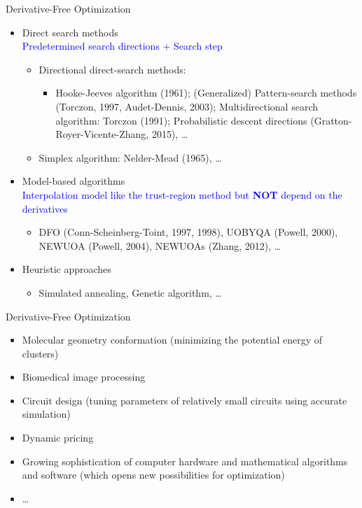 \documentclass{beamer}
\begin{document}
\begin{frame}{Derivative-Free Optimization}
	\begin{itemize}
		\item Direct search methods
			\\
			{\large
			\textcolor{blue}{Predetermined search
			directions + Search step} }
			\begin{itemize}
				\item Directional direct-search methods:
					\begin{itemize}
						\item Hooke-Jeeves algorithm (1961);
						 (Generalized) Pattern-search methods
							(Torczon, 1997, Audet-Dennis, 2003);
						Multidirectional search algorithm: Torczon (1991);
						Probabilistic descent directions
							(Gratton-Royer-Vicente-Zhang, 2015),
						\dots
					\end{itemize}
				\item Simplex algorithm: Nelder-Mead (1965),
					\dots
			\end{itemize}
		\item Model-based algorithms
			\\
			{\large \textcolor{blue}{
				Interpolation model like the trust-region method
				but \textbf{NOT} depend on the derivatives
				}}
			\begin{itemize}
				\item
					{\footnotesize
					DFO (Conn-Scheinberg-Toint,
					1997, 1998), UOBYQA (Powell, 2000), NEWUOA
					(Powell, 2004), NEWUOAs (Zhang, 2012), \dots
					}
			\end{itemize}
		\item Heuristic approaches
			\begin{itemize}
				\item Simulated annealing, Genetic algorithm, \ldots
			\end{itemize}
	\end{itemize}
\end{frame}

\begin{frame}{Derivative-Free Optimization}
\begin{itemize}
	\item Molecular geometry conformation
		(minimizing the potential energy of clusters)
	\item Biomedical image processing
	\item Circuit design (tuning parameters of relatively small
		circuits using accurate simulation)
	\item Dynamic pricing
	\item Growing sophistication of computer hardware and
		mathematical algorithms and software (which opens new
		possibilities for optimization)
	\item \dots
\end{itemize}
\end{frame}
\end{document}
